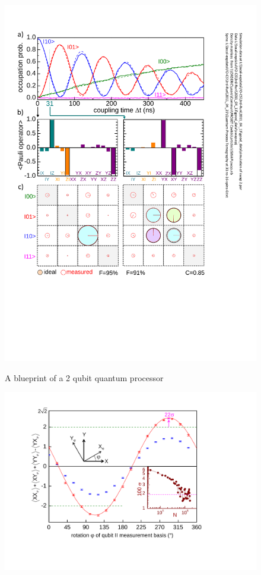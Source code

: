 \begin{figure}
	\centering
		\includegraphics[width=1.\textwidth]{./material/papers/iswap/submission1/Dewes_Figure2}
	\label{fig:iSwap2}
	\caption{A blueprint of a 2 qubit quantum processor}
\end{figure}

\begin{figure}
	\centering
		\includegraphics[width=1.\textwidth]{./material/papers/iswap/submission1/Dewes_Figure3}
	\label{fig:iSwap3}
	\caption{}
\end{figure}

